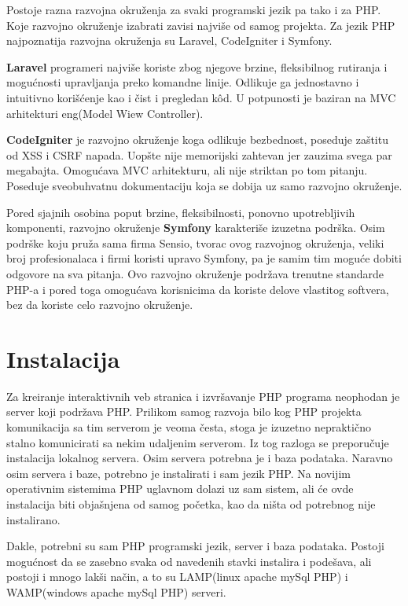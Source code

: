 \documentclass[a4paper]{article}
\begin{document}
{Postoje razna razvojna okruženja za svaki programski jezik pa tako i za PHP. Koje razvojno okruženje izabrati zavisi najviše od samog projekta. Za jezik PHP najpoznatija razvojna okruženja su Laravel\cite{laravel}, CodeIgniter\cite{codeigniter} i Symfony\cite{symfony}.

\textbf{Laravel} programeri najviše koriste zbog njegove brzine, fleksibilnog rutiranja i mogućnosti upravljanja preko komandne linije. Odlikuje ga jednostavno i intuitivno korišćenje kao i čist i pregledan k\^{o}d. U potpunosti je baziran na MVC arhitekturi eng(Model Wiew Controller).

\textbf{CodeIgniter} je razvojno okruženje koga odlikuje bezbednost, poseduje zaštitu od XSS i CSRF napada. Uopšte nije memorijski zahtevan jer zauzima svega par megabajta. Omogućava MVC arhitekturu, ali nije striktan po tom pitanju. Poseduje sveobuhvatnu dokumentaciju koja se dobija uz samo razvojno okruženje.

Pored sjajnih osobina poput brzine, fleksibilnosti, ponovno upotrebljivih komponenti, razvojno okruženje \textbf{Symfony} karakteriše izuzetna podrška. Osim podrške koju pruža sama firma Sensio, tvorac ovog razvojnog okruženja, veliki broj profesionalaca i firmi koristi upravo Symfony, pa je samim tim moguće dobiti odgovore na sva pitanja. Ovo razvojno okruženje podržava trenutne standarde PHP-a i pored toga omogućava korisnicima da koriste delove vlastitog softvera, bez da koriste celo razvojno okruženje.

\section{Instalacija}
Za kreiranje interaktivnih veb stranica i izvršavanje PHP programa neophodan je server koji podržava PHP. Prilikom samog razvoja bilo kog PHP projekta komunikacija sa tim serverom je veoma česta, stoga je izuzetno nepraktično stalno komunicirati sa nekim udaljenim serverom. Iz tog razloga se preporučuje instalacija lokalnog servera. Osim servera potrebna je i baza podataka. Naravno osim servera i baze, potrebno je instalirati i sam jezik PHP. Na novijim operativnim sistemima PHP uglavnom dolazi uz sam sistem, ali će ovde instalacija biti objašnjena od samog početka, kao da ništa od potrebnog nije instalirano.

Dakle, potrebni su sam PHP programski jezik, server i baza podataka. Postoji mogućnost da se zasebno svaka od navedenih stavki instalira i podešava, ali postoji i mnogo lakši način, a to su LAMP(linux apache mySql PHP) \cite{lamp} i WAMP(windows apache mySql PHP) \cite{wamp} serveri. 

}
\end{document}
